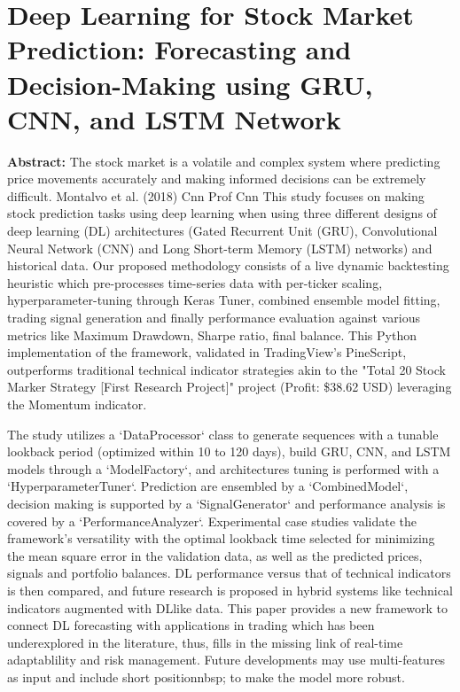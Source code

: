 \chapter{Deep Learning for Stock Market Prediction: Forecasting and Decision-Making using GRU, CNN, and LSTM Network}

\textbf{Abstract: }
The stock market is a volatile and complex system where predicting price movements accurately and making informed decisions can be extremely difficult. Montalvo et al. (2018) Cnn Prof Cnn This study focuses on making stock prediction tasks using deep learning when using three different designs of deep learning (DL) architectures (Gated Recurrent Unit (GRU), Convolutional Neural Network (CNN) and Long Short-term Memory (LSTM) networks) and historical data. Our proposed methodology consists of a live dynamic backtesting heuristic which pre-processes time-series data with per-ticker scaling, hyperparameter-tuning through Keras Tuner, combined ensemble model fitting, trading signal generation and finally performance evaluation against various metrics like Maximum Drawdown, Sharpe ratio, final balance. This Python implementation of the framework, validated in TradingView's PineScript, outperforms traditional technical indicator strategies akin to the "Total 20 Stock Marker Strategy [First Research Project]" project (Profit: \$38.62 USD) leveraging the Momentum indicator.

The study utilizes a `DataProcessor` class to generate sequences with a tunable lookback period (optimized within 10 to 120 days), build GRU, CNN, and LSTM models through a `ModelFactory`, and architectures tuning is performed with a `HyperparameterTuner`. Prediction are ensembled by a `CombinedModel`, decision making is supported by a `SignalGenerator` and performance analysis is covered by a `PerformanceAnalyzer`. Experimental case studies validate the framework's versatility with the optimal lookback time selected for minimizing the mean square error in the validation data, as well as the predicted prices, signals and portfolio balances. DL performance versus that of technical indicators is then compared, and future research is proposed in hybrid systems like technical indicators augmented with DLlike data. This paper provides a new framework to connect DL forecasting with applications in trading which has been underexplored in the literature, thus, fills in the missing link of real-time adaptablility and risk management. Future developments may use multi-features as input and include short positionnbsp; to make the model more robust.


